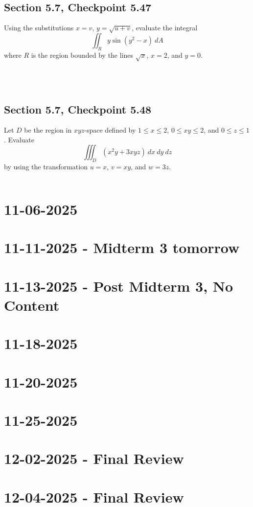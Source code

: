 \documentclass[]{mangos-musings}
\begin{document}
\subsection{Section 5.7, Checkpoint 5.47}
Using the substitutions $x = v$, $y = \sqrt{u + v}$, evaluate the integral 
\[\iint_R y \sin (y^2 - x) \ dA\]
where $R$ is the region bounded by the lines $\sqrt{x}$, $x = 2$, and $y = 0$.
\begin{align*}
  \\ \\ \\ \\ \\ \\ \\ \\ 
\end{align*}
%
%
%
%
\subsection{Section 5.7, Checkpoint 5.48}
Let $D$ be the region in $xyz$-space defined by $1 \le x \le 2$, $0 \le xy \le 2$, and $0 \le z \le 1$. Evaluate 
\[\iiint_D (x^2y + 3xyz) \ dx \ dy \ dz\]
by using the transformation $u = x$, $v = xy$, and $w = 3z$.
\begin{align*}
  \\ \\
\end{align*}
%
%
%
%
\newpage
\section{11-06-2025}

\newpage
\section{11-11-2025 - Midterm 3 tomorrow}

\newpage
\section{11-13-2025 - Post Midterm 3, No Content}

\newpage
\section{11-18-2025}

\newpage
\section{11-20-2025}

\newpage
\section{11-25-2025}

\newpage
\section{12-02-2025 - Final Review}

\newpage
\section{12-04-2025 - Final Review}
\end{document}
